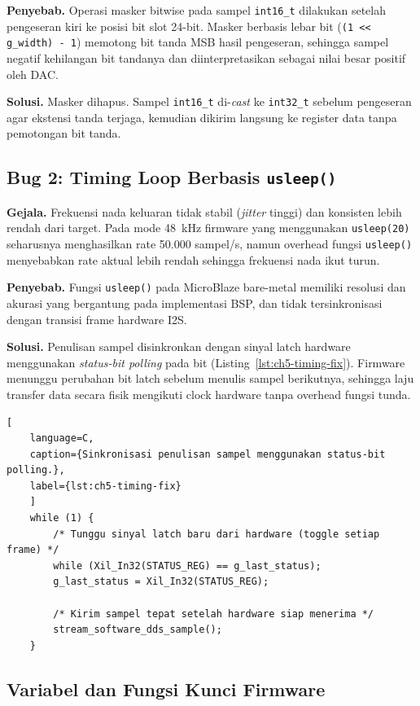 \textbf{Penyebab.} Operasi masker bitwise pada sampel \texttt{int16\_t} dilakukan setelah pengeseran kiri ke posisi bit slot 24-bit. Masker berbasis lebar bit (\texttt{(1 << g\_width) - 1}) memotong bit tanda MSB hasil pengeseran, sehingga sampel negatif kehilangan bit tandanya dan diinterpretasikan sebagai nilai besar positif oleh DAC.

\textbf{Solusi.} Masker dihapus. Sampel \texttt{int16\_t} di-\textit{cast} ke \texttt{int32\_t} sebelum pengeseran agar ekstensi tanda terjaga, kemudian dikirim langsung ke register data tanpa pemotongan bit tanda.

\subsection{Bug 2: Timing Loop Berbasis \texttt{usleep()}}

\textbf{Gejala.} Frekuensi nada keluaran tidak stabil (\textit{jitter} tinggi) dan konsisten lebih rendah dari target. Pada mode 48~kHz firmware yang menggunakan \texttt{usleep(20)} seharusnya menghasilkan rate 50.000 sampel/s, namun overhead fungsi \texttt{usleep()} menyebabkan rate aktual lebih rendah sehingga frekuensi nada ikut turun.

\textbf{Penyebab.} Fungsi \texttt{usleep()} pada MicroBlaze bare-metal memiliki resolusi dan akurasi yang bergantung pada implementasi BSP, dan tidak tersinkronisasi dengan transisi frame hardware I2S.

\textbf{Solusi.} Penulisan sampel disinkronkan dengan sinyal latch hardware menggunakan \textit{status-bit polling} pada bit  (Listing~\ref{lst:ch5-timing-fix}). Firmware menunggu perubahan bit latch sebelum menulis sampel berikutnya, sehingga laju transfer data secara fisik mengikuti clock hardware tanpa overhead fungsi tunda.

\begin{lstlisting}[
	language=C,
	caption={Sinkronisasi penulisan sampel menggunakan status-bit polling.},
	label={lst:ch5-timing-fix}
	]
	while (1) {
		/* Tunggu sinyal latch baru dari hardware (toggle setiap frame) */
		while (Xil_In32(STATUS_REG) == g_last_status);
		g_last_status = Xil_In32(STATUS_REG);
		
		/* Kirim sampel tepat setelah hardware siap menerima */
		stream_software_dds_sample();
	}
\end{lstlisting}

\subsection{Variabel dan Fungsi Kunci Firmware}

